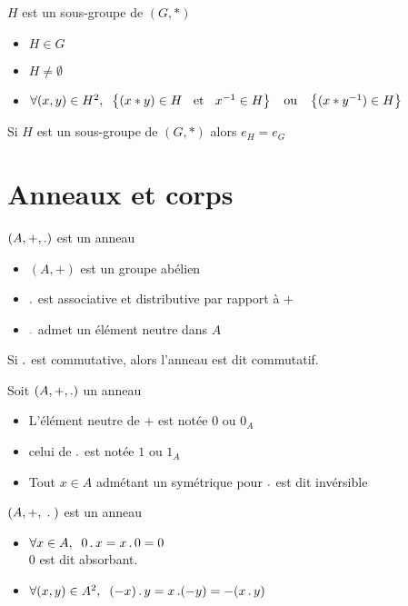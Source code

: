 \begin{dfn}
$H$ est un sous-groupe de $(G, *)$ \ssi
\begin{itemize}
    \item $H \in G$
    \item $H \neq \emptyset$
    \item $\forall (x, y) \in H^2, \;\;
    \left\{(x * y) \in H \;\;\text{ et }\;\; x^{-1} \in H\right\}
    \;\;\text{ ou }\;\; \left\{(x * y^{-1}) \in H\right\}$
\end{itemize}
\end{dfn}

\begin{rem}
Si $H$ est un sous-groupe de $(G, *)$ alors $e_H = e_G$
\end{rem}

\pagebreak

\section{Anneaux et corps}

\begin{dfn}[Anneau]
$(A, +, \operatorname{.})$ est un anneau \ssi
\begin{itemize}
    \item $(A, +)$ est un groupe abélien
    \item $\operatorname{.}$ est associative et distributive par rapport à $+$
    \item $\operatorname{.}$ admet un élément neutre dans $A$
\end{itemize}
Si $\operatorname{.}$ est commutative, alors l'anneau est dit commutatif.
\end{dfn}

\begin{dfn}
Soit $(A, +, \operatorname{.})$ un anneau
\begin{itemize}
    \item L'élément neutre de $+$ est notée $0$ ou $0_A$
    \item celui de $\operatorname{.}$ est notée $1$ ou $1_A$
    \item Tout $x \in A$ admétant un symétrique pour $\operatorname{.}$ est dit invérsible
\end{itemize}
\end{dfn}

\begin{prp}
$(A, +, \;\operatorname{.}\;)$ est un anneau
\begin{itemize}
    \item $\forall x \in A, \;\; 0 \operatorname{.} x = x \operatorname{.} 0 = 0$ \\
        $0$ est dit absorbant.
    \item $\forall (x, y) \in A^2, \;\; (-x) \operatorname{.} y = x \operatorname{.} (-y) = -(x \operatorname{.} y)$
\end{itemize}
\end{prp}

